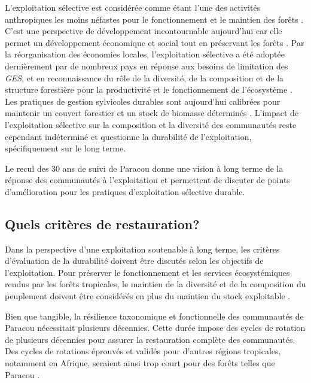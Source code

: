 \documentclass[
  11pt,
  french,
  A4paper,
  extrafontsizes,onecolumn,openright
  ]{memoir}
\begin{document}
L'exploitation sélective est considérée comme étant l'une des activités
anthropiques les moins néfastes pour le fonctionnement et le maintien
des forêts \autocite{Edwards2014}. C'est une perspective de
développement incontournable aujourd'hui car elle permet un
développement économique et social tout en préservant les forêts
\autocite{Chaudhary2016}. Par la réorganisation des économies locales,
l'exploitation sélective a été adoptée dernièrement par de nombreux pays
en réponse aux besoins de limitation des \emph{GES}, et en
reconnaissance du rôle de la diversité, de la composition et de la
structure forestière pour la productivité et le fonctionnement de
l'écosystème \autocite{Begon2006}. Les pratiques de gestion sylvicoles
durables sont aujourd'hui calibrées pour maintenir un couvert forestier
et un stock de biomasse déterminés \autocite{ITTO2005}. L'impact de
l'exploitation sélective sur la composition et la diversité des
communautés reste cependant indéterminé et questionne la durabilité de
l'exploitation, spécifiquement sur le long terme.

Le recul des 30 ans de suivi de Paracou donne une vision à long terme de
la réponse des communautés à l'exploitation et permettent de discuter de
points d'amélioration pour les pratiques d'exploitation sélective
durable.

\subsection{Quels critères de
restauration?}\label{quels-criteres-de-restauration}

Dans la perspective d'une exploitation soutenable à long terme, les
critères d'évaluation de la durabilité doivent être discutés selon les
objectifs de l'exploitation. Pour préserver le fonctionnement et les
services écosystémiques rendus par les forêts tropicales, le maintien de
la diversité et de la composition du peuplement doivent être considérés
en plus du maintien du stock exploitable
\autocites{ITTO2005}{Barlow2018}.

Bien que tangible, la résilience taxonomique et fonctionnelle des
communautés de Paracou nécessitait plusieurs décennies. Cette durée
impose des cycles de rotation de plusieurs décennies pour assurer la
restauration complète des communautés. Des cycles de rotations éprouvés
et validés pour d'autres régions tropicales, notamment en Afrique,
seraient ainsi trop court pour des forêts telles que Paracou
\autocite{Durrieu1998}.
\end{document}
